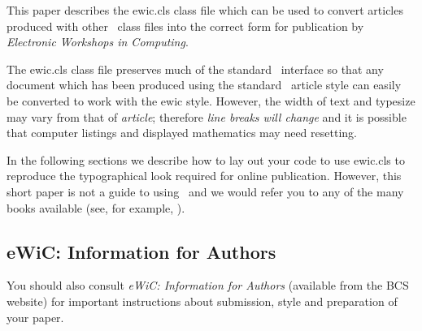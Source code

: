 
This paper describes the ewic.cls class file which can be used to
convert articles produced with other \LaTeXe\ class files into the
correct form for publication by \emph{Electronic Workshops in
Computing}.

The ewic.cls class file preserves much of the standard \LaTeXe\
interface so that any document which has been produced using the
standard \LaTeXe\ article style can easily be converted to work
with the ewic style. However, the width of text and typesize may
vary from that of \emph{article}; therefore \emph{line breaks will
change} and it is possible that computer listings and displayed
mathematics may need resetting.

In the following sections we describe how to lay out your code to
use ewic.cls to reproduce the typographical look required for
online publication. However, this short paper is not a guide to
using \LaTeXe\ and we would refer you to any of the many books
available (see, for example, \cite{Companion,KopkaDaly,Lamport}).

\subsection{eWiC: Information for Authors}
You should also consult \emph{eWiC: Information for Authors} (available
from the BCS website) for important instructions about submission,
style and preparation of your paper.